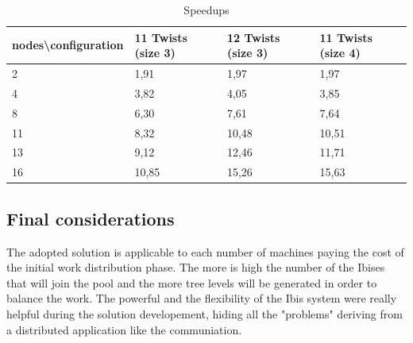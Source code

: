 \documentclass[a4paper]{article}
\begin{document}
  \begin{table}[!ht]
\centering
  \begin{tabular}{l|l|l|l}
\multicolumn{1}{c}{\bfseries nodes\textbackslash configuration} & 11 Twists (size 3) & 12 Twists (size 3) & 11 Twists (size 4) \\ \hline
2 & 1,91 & 1,97 & 1,97 \\ \hline
4 & 3,82 & 4,05 & 3,85 \\ \hline
8 & 6,30 & 7,61 & 7,64 \\ \hline
11 & 8,32 & 10,48 & 10,51 \\ \hline
13 & 9,12 & 12,46 & 11,71 \\ \hline
16 & 10,85 & 15,26 & 15,63
  \end{tabular}
  \caption{Speedups}
  \label{tab:spe_all}
\end{table}

\subsection{Final considerations}
\label{sec:fc}
The adopted solution is applicable to each number of machines paying the cost of the initial work distribution phase. The more is high the number of the Ibises that will join the pool and the more tree levels will be generated in order to balance the work. The powerful and the flexibility of the Ibis system were really helpful during the solution developement, hiding all the "problems" deriving from a distributed application like the communiation. 


\printbibliography 
\end{document}

